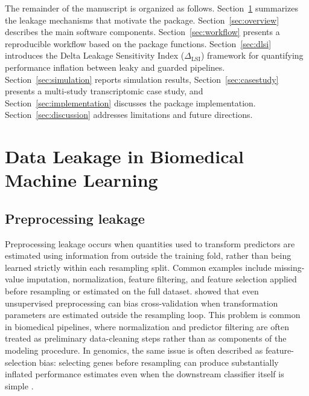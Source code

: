 \documentclass[article,shortnames]{jss}
\begin{document}
The remainder of the manuscript is organized as follows. Section~\ref{sec:leakage} summarizes the leakage mechanisms that motivate the package. Section~\ref{sec:overview} describes the main software components. Section~\ref{sec:workflow} presents a reproducible workflow based on the package functions. Section~\ref{sec:dlsi} introduces the Delta Leakage Sensitivity Index ($\Delta_{\mathrm{LSI}}$) framework for quantifying performance inflation between leaky and guarded pipelines. Section~\ref{sec:simulation} reports simulation results, Section~\ref{sec:casestudy} presents a multi-study transcriptomic case study, and Section~\ref{sec:implementation} discusses the package implementation. Section~\ref{sec:discussion} addresses limitations and future directions.




\section{Data Leakage in Biomedical Machine Learning}\label{sec:leakage}
\subsection{Preprocessing leakage}

Preprocessing leakage occurs when quantities used to transform predictors are estimated using information from outside the training fold, rather than being learned strictly within each resampling split. Common examples include missing-value imputation, normalization, feature filtering, and feature selection applied before resampling or estimated on the full dataset. \citet{moscovich2022} showed that even unsupervised preprocessing can bias cross-validation when transformation parameters are estimated outside the resampling loop. This problem is common in biomedical pipelines, where normalization and predictor filtering are often treated as preliminary data-cleaning steps rather than as components of the modeling procedure. In genomics, the same issue is often described as feature-selection bias: selecting genes before resampling can produce substantially inflated performance estimates even when the downstream classifier itself is simple \citep{ambroise2002, simon2003, subramanian2013}.
\end{document}
